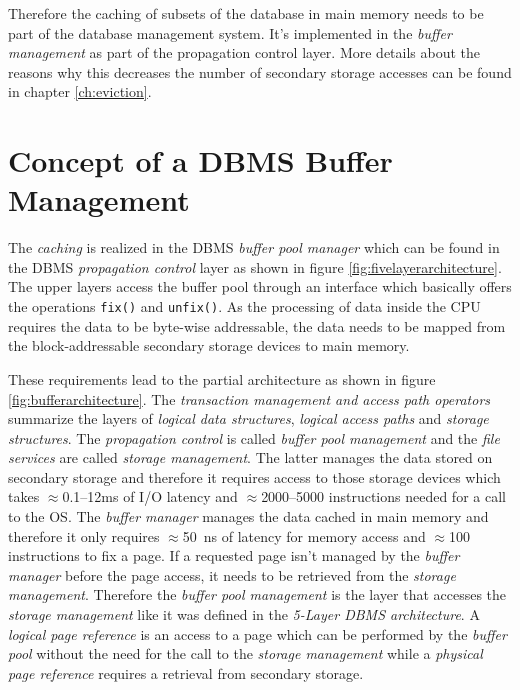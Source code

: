     Therefore the caching of subsets of the database in main memory needs to be part of the database management system. It's implemented in the \emph{buffer management} as part of the propagation control layer. More details about the reasons why this decreases the number of secondary storage accesses can be found in chapter \ref{ch:eviction}.

\section[Concept of a DBMS Buffer Management]{Concept of a DBMS Buffer Management}

    The \emph{caching} is realized in the DBMS \emph{buffer pool manager} which can be found in the DBMS \emph{propagation control} layer as shown in figure \ref{fig:fivelayerarchitecture}. The upper layers access the buffer pool through an interface which basically offers the operations \lstinline{fix()} and \lstinline{unfix()}. As the processing of data inside the CPU requires the data to be byte-wise addressable, the data needs to be mapped from the block-addressable secondary storage devices to main memory.

    These requirements lead to the partial architecture as shown in figure \ref{fig:bufferarchitecture}. The \emph{transaction management and access path operators} summarize the layers of \emph{logical data structures}, \emph{logical access paths} and \emph{storage structures}. The \emph{propagation control} is called \emph{buffer pool management} and the \emph{file services} are called \emph{storage management}. The latter manages the data stored on secondary storage and therefore it requires access to those storage devices which takes $\approx$\numrange{0.1}{12}\si{\milli\second} of I/O latency and $\approx$\numrange{2000}{5000} instructions needed for a call to the OS. The \emph{buffer manager} manages the data cached in main memory and therefore it only requires $\approx$\SI{50}{\nano\second} of latency for memory access and $\approx$\num{100} instructions to fix a page. If a requested page isn't managed by the \emph{buffer manager} before the page access, it needs to be retrieved from the \emph{storage management}. Therefore the \emph{buffer pool management} is the layer that accesses the \emph{storage management} like it was defined in the \emph{5-Layer DBMS architecture}. A \emph{logical page reference} is an access to a page which can be performed by the \emph{buffer pool} without the need for the call to the \emph{storage management} while a \emph{physical page reference} requires a retrieval from secondary storage.

